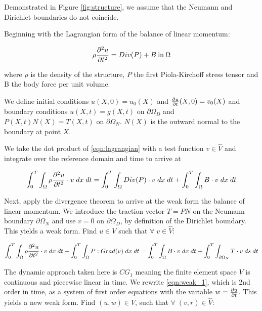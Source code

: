 \documentclass{article}
\begin{document}
Demonstrated in Figure \ref{fig:structure}, we assume that the Neumann and Dirichlet boundaries do not coincide. 

Beginning with the Lagrangian form of the balance of linear momentum: 

\begin{equation}
\rho \frac{\partial^2 u}{\partial t^2} = Div (P) + B \: \text{in} \: \Omega
\label{eqn:lagrangian}
\end{equation}

where $\rho$ is the density of the structure, $P$ the first Piola-Kirchoff stress tensor and B the body force per unit volume. 

We define initial conditions $u(X,0) = u_0(X)$ and $\frac{\partial u}{\partial t}(X,0) = v_0(X)$ and boundary conditions $u(X,t) = g(X,t)$ on $\partial \Omega_D$ and $P(X,t) N(X) = T(X,t)$ on $\partial \Omega_N$. $N(X)$ is the outward normal to the boundary at point $X$. 

We take the dot product of \ref{eqn:lagrangian} with a test function $v \in \hat{V}$ and integrate over the reference domain and time to arrive at 

\begin{equation}
\int_{0}^{T} \int_{\Omega} \rho \frac{\partial^2 u}{\partial t^2} \cdot v \; dx  \; dt  = \int_{0}^{T} \int_{\Omega} Div(P) \cdot v \; dx \; dt + \int_{0}^{T} \int_{\Omega} B \cdot v \; dx \; dt 
\end{equation}

Next, apply the divergence theorem to arrive at the weak form the balance of linear momentum. We introduce the traction vector $T = PN$ on the Neumann boundary $\partial \Omega_N$ and use $v = 0$ on $\partial \Omega_D$, by definition of the Dirichlet boundary. This yields a weak form. Find $u \in V$ such that $ \forall \;  v \in \hat{V}$:
   
\begin{equation}
\int_{0}^{T} \int_{\Omega} \rho \frac{\partial^2 u}{\partial t^2} \cdot v \; dx  \; dt + \int_{0}^{T} \int_{\Omega} P: Grad(v) \; dx \; dt = \int_{0}^{T} \int_{\Omega} B \cdot v \; dx \; dt + \int_{0}^{T} \int_{\partial \Omega_N} T \cdot v \; ds \; dt 
\label{eqn:weak_1}
\end{equation}

The dynamic approach taken here is $CG_1$ meaning the finite element space $V$ is continuous and piecewise linear in time. We rewrite \ref{eqn:weak_1}, which is 2nd order in time, as a system of first order equations with the variable $w = \frac{\partial u}{\partial t}$. This yields a new weak form. Find $(u, w) \in V$, such that $\forall \; (v,r) \in \hat{V}$:
\end{document}
